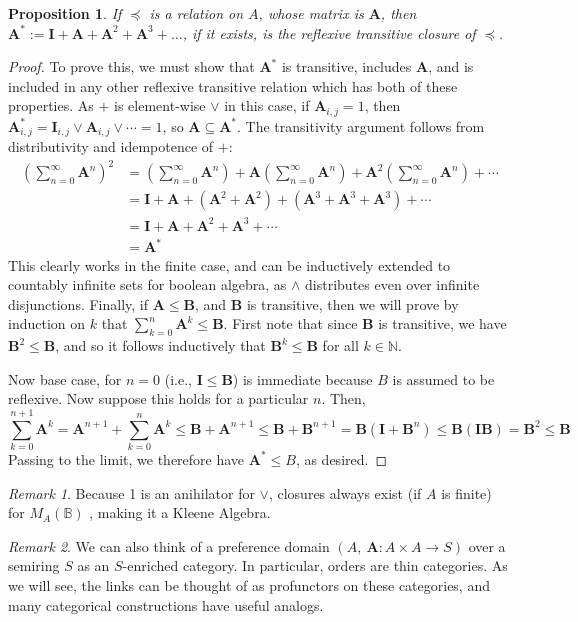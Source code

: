 \documentclass{article}
\theoremstyle{plain}
\newtheorem{prop}[theorem]{Proposition}
\theoremstyle{definition}
\theoremstyle{remark}
\newtheorem*{remark}{Remark}
\newcommand\leqc{\preccurlyeq}
\newcommand\mat[1]{\mathbf #1}
\begin{document}
	\begin{prop}
		If $\leqc$ is a relation on $A$, whose matrix is $\mat A$, then $\mat A^* := \mat I + \mat A + \mat A^2 + \mat A^3 + \ldots$, if it exists, is the reflexive transitive closure of $\leqc$.
	\end{prop}
	\begin{proof}
		To prove this, we must show that $\mat A^*$ is transitive, includes $\mat A$, and is included in any other reflexive transitive relation which has both of these properties. 
		As $+$ is element-wise $\lor$ in this case, if $\mat A_{i,j} = 1$, then $\mat A_{i,j}^* = \mat{I}_{i,j} \lor \mat A_{i,j} \lor \cdots = 1$, so $\mat A \subseteq \mat A^*$. The transitivity argument follows from distributivity and idempotence of $+$: 
		\begin{align*}
			\left(\sum_{n=0}^\infty \mat A^n \right)^2 &= \left(\sum_{n=0}^\infty \mat A^n \right) + \mat A \left(\sum_{n=0}^\infty \mat A^n \right) + \mat A^2 \left(\sum_{n=0}^\infty \mat A^n \right)  + \cdots \\
			&= \mat I + \mat A + (\mat A^2 + \mat A^2) + (\mat A^3 +\mat A^3 + \mat A^3) +\cdots \\
			&= \mat I + \mat A + \mat A^2 + \mat A^3 + \cdots\\
			&= \mat A^*
		\end{align*}
		This clearly works in the finite case, and can be inductively extended to countably infinite sets for boolean algebra, as $\land$ distributes even over infinite disjunctions. Finally, if $\mat A \leq \mat B$, and $\mat B$ is transitive, then we will prove by induction on $k$ that $\sum_{k=0}^n \mat A^k \leq \mat B$. First note that since $\mat B$ is transitive, we have $\mat B^2 \leq \mat B$, and so it follows inductively that $\mat B^k \leq \mat B$ for all $k \in \mathbb N$. 
		
		Now base case, for $n=0$ (i.e., $\mat I \leq \mat B$) is immediate because $B$ is assumed to be reflexive. Now suppose this holds for a particular $n$. Then,		
		\begin{equation*}
			\sum_{k=0}^{n+1} \mat A^k  = \mat A^{n+1}  + \sum_{k=0}^n \mat A^k \leq \mat B + \mat A^{n+1} \leq \mat B + \mat B^{n+1} = \mat B (\mat I + \mat B^n) \leq \mat B (\mat I \mat B) = \mat B^2 \leq \mat B
		\end{equation*}
		Passing to the limit, we therefore have $\mat A^* \leq B$, as desired.		
	\end{proof}
	\begin{remark}
		Because 1 is an anihilator for $\lor$, closures always exist (if $A$ is finite) for $M_A(\mathbb B)$ \cite{pathproblems-lec3}, making it a Kleene Algebra.
	\end{remark}
	\begin{remark}
		We can also think of a preference domain $(A,~\mat A\colon A\times A \to S)$ over a semiring $S$ as an $S$-enriched category. In particular, orders are thin categories. As we will see, the links can be thought of as profunctors on these categories, and many categorical constructions have useful analogs.
	\end{remark}
\end{document}

